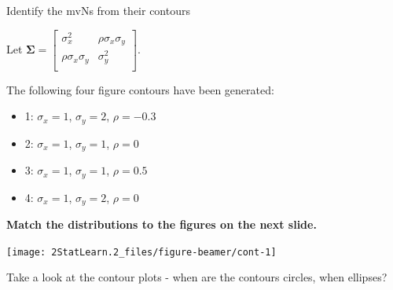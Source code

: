 \documentclass[ignorenonframetext,]{beamer}
\providecommand{\tightlist}{%
  \setlength{\itemsep}{0pt}\setlength{\parskip}{0pt}}
\begin{document}
\begin{frame}

\begin{block}{Identify the mvNs from their contours}

\vspace{4mm}

Let
\(\mathbf\Sigma=\left[\begin{array}{cc} \sigma_x^2 & \rho\sigma_{x}\sigma_{y}\\\rho\sigma_{x}\sigma_{y}&\sigma_y^2\\ \end{array} \right]\).

\vspace{4mm} The following four figure contours have been generated:

\begin{itemize}
\tightlist
\item
  1: \(\sigma_x=1\), \(\sigma_y=2\), \(\rho=-0.3\)
\item
  2: \(\sigma_x=1\), \(\sigma_y=1\), \(\rho=0\)
\item
  3: \(\sigma_x=1\), \(\sigma_y=1\), \(\rho=0.5\)
\item
  4: \(\sigma_x=1\), \(\sigma_y=2\), \(\rho=0\)
\end{itemize}

\vspace{8mm}

\textbf{Match the distributions to the figures on the next slide.}

\end{block}

\end{frame}

\begin{frame}

\begin{center}\texttt{[image: 2StatLearn.2\_files/figure-beamer/cont-1]} \end{center}

Take a look at the contour plots - when are the contours circles, when
ellipses?

\end{frame}
\end{document}
